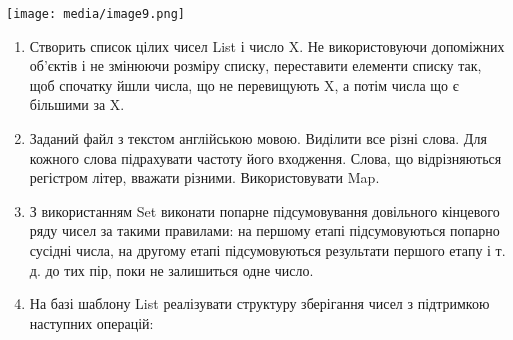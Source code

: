 \documentclass[]{article}
\begin{document}
\texttt{[image: media/image9.png]}

\begin{enumerate}
\def\labelenumi{\arabic{enumi})}
\item
  Створить список цілих чисел List і число X. Не використовуючи
  допоміжних об'єктів і не змінюючи розміру списку, переставити елементи
  списку так, щоб спочатку йшли числа, що не перевищують X, а потім
  числа що є більшими за X.
\item
  Заданий файл з текстом англійською мовою. Виділити все різні слова.
  Для кожного слова підрахувати частоту його входження. Слова, що
  відрізняються регістром літер, вважати різними. Використовувати Map.
\item
  З використанням Set виконати попарне підсумовування довільного
  кінцевого ряду чисел за такими правилами: на першому етапі
  підсумовуються попарно сусідні числа, на другому етапі підсумовуються
  результати першого етапу і т. д. до тих пір, поки не залишиться одне
  число.
\item
  На базі шаблону List реалізувати структуру зберігання чисел з
  підтримкою наступних операцій:


\end{enumerate}
\end{document}
